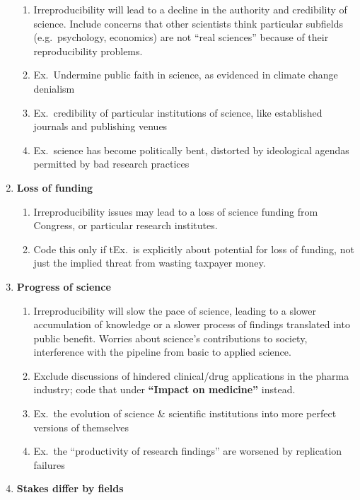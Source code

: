 \documentclass[
]{scrartcl}
\begin{document}
\begin{enumerate}
  \begin{enumerate}

  \item
    Irreproducibility will lead to a decline in the authority and
    credibility of science. Include concerns that other scientists think
    particular subfields (e.g.~psychology, economics) are not ``real
    sciences'' because of their reproducibility problems.
  \item
    Ex.~Undermine public faith in science, as evidenced in climate
    change denialism
  \item
    Ex.~credibility of particular institutions of science, like
    established journals and publishing venues
  \item
    Ex.~science has become politically bent, distorted by ideological
    agendas permitted by bad research practices
  \end{enumerate}
\item
  \textbf{Loss of funding}

  \begin{enumerate}

  \item
    Irreproducibility issues may lead to a loss of science funding from
    Congress, or particular research institutes.
  \item
    Code this only if tEx.~is explicitly about potential for loss of
    funding, not just the implied threat from wasting taxpayer money.
  \end{enumerate}
\item
  \textbf{Progress of science}

  \begin{enumerate}

  \item
    Irreproducibility will slow the pace of science, leading to a slower
    accumulation of knowledge or a slower process of findings translated
    into public benefit. Worries about science's contributions to
    society, interference with the pipeline from basic to applied
    science.
  \item
    Exclude discussions of hindered clinical/drug applications in the
    pharma industry; code that under \textbf{``Impact on medicine''}
    instead.
  \item
    Ex.~the evolution of science \& scientific institutions into more
    perfect versions of themselves
  \item
    Ex.~the ``productivity of research findings'' are worsened by
    replication failures
  \end{enumerate}
\item
  \textbf{Stakes differ by fields}


\end{enumerate}
\end{document}
